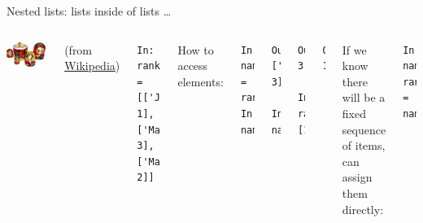 \documentclass[aspectratio=169,usenames,dvipsnames]{beamer}
\begin{document}
\begin{frame}[fragile]{Nested lists: lists inside of lists \dots}
    \begin{columns}
            \includegraphics[width=0.95\textwidth]{fig/russiandolls}

            {\scriptsize
            (from \href{https://en.wikipedia.org/wiki/Matryoshka_doll#/media/File:Matryoshka_transparent.png}{Wikipedia})}
\begin{lstlisting}
In: ranking = [['John', 1], ['Mary', 3], ['Max', 2]]
\end{lstlisting}

\pause
How to access elements:
\begin{lstlisting}
In: name_and_rank = ranking[1]
In: name_and_rank
\end{lstlisting}\vspace{-1em}\pause\begin{lstlisting}
Out: ['Mary', 3]

In: name_and_rank[1]
\end{lstlisting}\vspace{-1em}\pause\begin{lstlisting}
Out: 3

In: ranking[0][1]
\end{lstlisting}\vspace{-1em}\pause\begin{lstlisting}
Out: 1
\end{lstlisting}
\pause
If we know there will be a fixed sequence of items,
can assign them directly:
\begin{lstlisting}
In: name, rank = name_and_rank
\end{lstlisting}
    \end{columns}
\end{frame}
\end{document}
